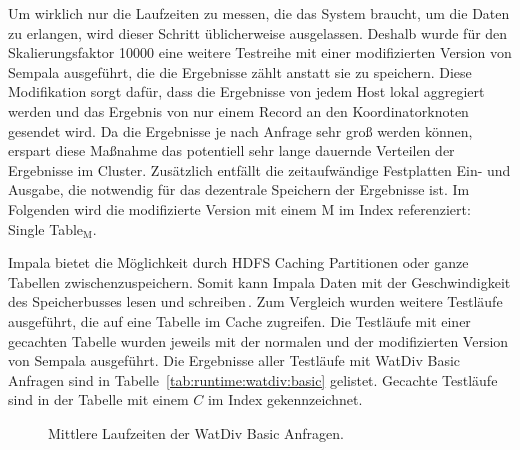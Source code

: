\documentclass[
  a4paper,
  12pt,
  oneside,
  parskip=half,
  headsepline,
]{scrartcl}
\begin{document}
Um wirklich nur die Laufzeiten zu messen, die das System braucht, um die Daten zu
erlangen, wird dieser Schritt üblicherweise ausgelassen. Deshalb wurde für den
Skalierungsfaktor 10000 eine weitere Testreihe mit einer modifizierten Version
von Sempala ausgeführt, die die Ergebnisse zählt anstatt sie zu speichern. Diese
Modifikation sorgt dafür, dass die Ergebnisse von jedem Host lokal aggregiert
werden und das Ergebnis von nur einem Record an den Koordinatorknoten gesendet
wird. Da die Ergebnisse je nach Anfrage sehr groß werden können, erspart diese
Maßnahme das potentiell sehr lange dauernde Verteilen der Ergebnisse im Cluster.
Zusätzlich entfällt die zeitaufwändige Festplatten Ein- und Ausgabe, die
notwendig für das dezentrale Speichern der Ergebnisse ist. Im Folgenden wird die
modifizierte Version mit einem M im Index referenziert: Single Table$_\text{M}$.

Impala bietet die Möglichkeit durch HDFS Caching Partitionen oder ganze Tabellen
zwischenzuspeichern. Somit kann Impala Daten mit der Geschwindigkeit des
Speicherbusses lesen und schreiben\,\cite{impala}. Zum Vergleich wurden weitere
Testläufe ausgeführt, die auf eine Tabelle im Cache zugreifen. Die Testläufe mit
einer gecachten Tabelle wurden jeweils mit der normalen und der
modifizierten Version von Sempala ausgeführt. Die Ergebnisse aller Testläufe mit
WatDiv Basic Anfragen sind in Tabelle~\ref{tab:runtime:watdiv:basic} gelistet.
Gecachte Testläufe sind in der Tabelle mit einem $C$ im Index gekennzeichnet.

\begin{figure*}[tb]
	\centering
	\caption{Mittlere Laufzeiten der WatDiv Basic Anfragen.}
	\label{fig:runtime:watdiv:basic:am}
\end{figure*}
\end{document}
